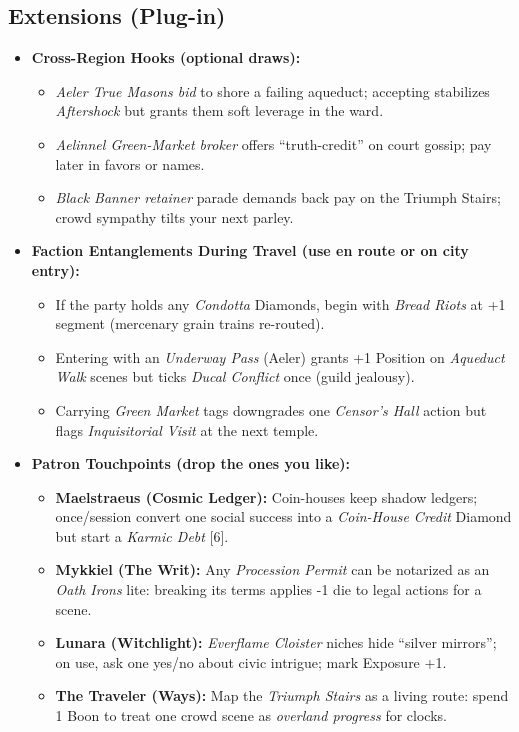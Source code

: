 \subsection*{Extensions (Plug-in)}
\label{sec:ecktoria-extensions}
\begin{itemize}
  \item \textbf{Cross-Region Hooks (optional draws):}
  \begin{itemize}
    \item \emph{Aeler True Masons bid} to shore a failing aqueduct; accepting stabilizes \emph{Aftershock} but grants them soft leverage in the ward.
    \item \emph{Aelinnel Green-Market broker} offers “truth-credit” on court gossip; pay later in favors or names.
    \item \emph{Black Banner retainer} parade demands back pay on the Triumph Stairs; crowd sympathy tilts your next parley.
  \end{itemize}

  \item \textbf{Faction Entanglements During Travel (use en route or on city entry):}
  \begin{itemize}
    \item If the party holds any \emph{Condotta} Diamonds, begin with \emph{Bread Riots} at +1 segment (mercenary grain trains re-routed).
    \item Entering with an \emph{Underway Pass} (Aeler) grants +1 Position on \emph{Aqueduct Walk} scenes but ticks \emph{Ducal Conflict} once (guild jealousy).
    \item Carrying \emph{Green Market} tags downgrades one \emph{Censor's Hall} action but flags \emph{Inquisitorial Visit} at the next temple.
  \end{itemize}

  \item \textbf{Patron Touchpoints (drop the ones you like):}
  \begin{itemize}
    \item \textbf{Maelstraeus (Cosmic Ledger):} Coin-houses keep shadow ledgers; once/session convert one social success into a \emph{Coin-House Credit} Diamond but start a \emph{Karmic Debt} [6].
    \item \textbf{Mykkiel (The Writ):} Any \emph{Procession Permit} can be notarized as an \emph{Oath Irons} lite: breaking its terms applies -1 die to legal actions for a scene.
    \item \textbf{Lunara (Witchlight):} \emph{Everflame Cloister} niches hide “silver mirrors”; on use, ask one yes/no about civic intrigue; mark Exposure +1.
    \item \textbf{The Traveler (Ways):} Map the \emph{Triumph Stairs} as a living route: spend 1 Boon to treat one crowd scene as \emph{overland progress} for clocks.
  \end{itemize}


\end{itemize}

